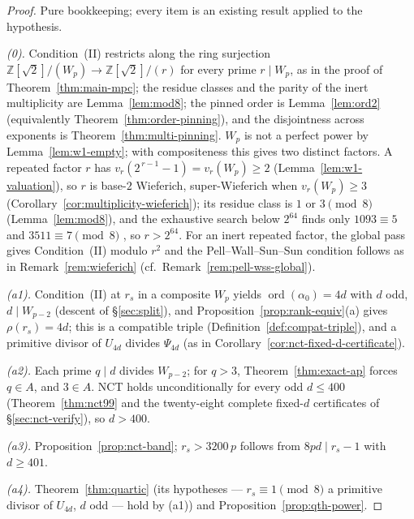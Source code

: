 \documentclass[11pt]{amsart}
\theoremstyle{plain}
\theoremstyle{definition}
\theoremstyle{remark}
\numberwithin{equation}{section}
\newcommand{\ord}{\operatorname{ord}}
\newcommand{\Z}{\mathbb{Z}}
\begin{document}
\begin{proof}
Pure bookkeeping; every item is an existing result applied to the
hypothesis.

\emph{(0).} Condition~(II) restricts along the ring surjection
$\Z[\sqrt 2]/(W_p) \to \Z[\sqrt 2]/(r)$ for every prime $r \mid W_p$, as
in the proof of Theorem~\ref{thm:main-mpc}; the residue classes and the
parity of the inert multiplicity are Lemma~\ref{lem:mod8}; the pinned
order is Lemma~\ref{lem:ord2} (equivalently
Theorem~\ref{thm:order-pinning}), and the disjointness across exponents
is Theorem~\ref{thm:multi-pinning}. $W_p$ is not a perfect power by
Lemma~\ref{lem:w1-empty}; with compositeness this gives two distinct
factors. A repeated factor $r$ has
$v_r(2^{\,r-1}-1) = v_r(W_p) \geq 2$ (Lemma~\ref{lem:w1-valuation}), so
$r$ is base-$2$ Wieferich, super-Wieferich when $v_r(W_p) \geq 3$
(Corollary~\ref{cor:multiplicity-wieferich}); its residue class is $1$
or $3 \pmod 8$ (Lemma~\ref{lem:mod8}), and the exhaustive search below
$2^{64}$ finds only $1093 \equiv 5$ and $3511 \equiv 7 \pmod 8$
\cite{ref:OEISWieferich}, so $r > 2^{64}$. For an inert repeated factor,
the global pass gives Condition~(II) modulo $r^2$ and the
Pell--Wall--Sun--Sun condition follows as in Remark~\ref{rem:wieferich}
(cf.\ Remark~\ref{rem:pell-wss-global}).

\emph{(a1).} Condition~(II) at $r_s$ in a composite $W_p$ yields
$\ord(\alpha_0) = 4d$ with $d$ odd, $d \mid W_{p-2}$ (descent of
\S\ref{sec:split}), and Proposition~\ref{prop:rank-equiv}(a) gives
$\rho(r_s) = 4d$; this is a compatible triple
(Definition~\ref{def:compat-triple}), and a primitive divisor of
$U_{4d}$ divides $\Psi_{4d}$ (as in
Corollary~\ref{cor:nct-fixed-d-certificate}).

\emph{(a2).} Each prime $q \mid d$ divides $W_{p-2}$; for $q > 3$,
Theorem~\ref{thm:exact-ap} forces $q \in A$, and $3 \in A$. NCT holds
unconditionally for every odd $d \leq 400$ (Theorem~\ref{thm:nct99} and
the twenty-eight complete fixed-$d$ certificates of
\S\ref{sec:nct-verify}), so $d > 400$.

\emph{(a3).} Proposition~\ref{prop:nct-band}; $r_s > 3200\,p$ follows
from $8 p d \mid r_s - 1$ with $d \geq 401$.

\emph{(a4).} Theorem~\ref{thm:quartic} (its hypotheses --- $r_s \equiv 1
\pmod 8$ a primitive divisor of $U_{4d}$, $d$ odd --- hold by (a1)) and
Proposition~\ref{prop:qth-power}.


\end{proof}
\end{document}
